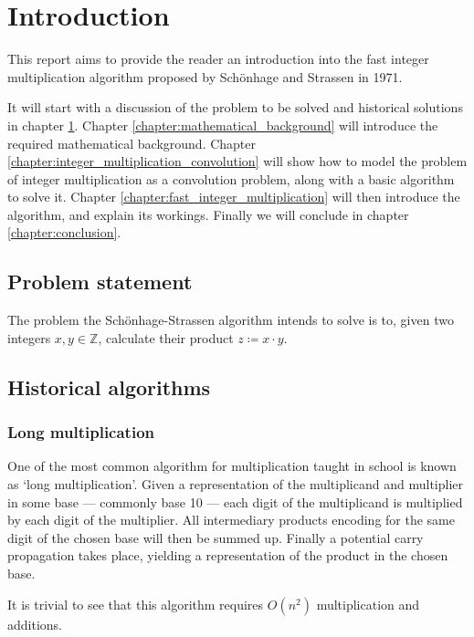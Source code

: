 \chapter{Introduction}
\label{chapter:introduction}

This report aims to provide the reader an introduction into the fast integer
multiplication algorithm proposed by Schönhage and Strassen in 1971.
\autocite{schonhageSchnelleMultiplikationGrosser1971}

It will start with a discussion of the problem to be solved and historical
solutions in chapter \ref{chapter:introduction}. Chapter
\ref{chapter:mathematical_background} will introduce the required mathematical
background. Chapter \ref{chapter:integer_multiplication_convolution} will show
how to model the problem of integer multiplication as a convolution problem,
along with a basic algorithm to solve it. Chapter
\ref{chapter:fast_integer_multiplication} will then introduce the algorithm,
and explain its workings. Finally we will conclude in chapter
\ref{chapter:conclusion}.

\section{Problem statement}

The problem the Schönhage-Strassen algorithm intends to solve is to, given two
integers $x, y \in \mathbb{Z}$, calculate their product $z \coloneqq x \cdot
y$.

\section{Historical algorithms}

\subsection{Long multiplication}

One of the most common algorithm for multiplication taught in school is known
as `long multiplication'. Given a representation of the multiplicand and
multiplier in some base --- commonly base 10 --- each digit of the multiplicand
is multiplied by each digit of the multiplier. All intermediary products
encoding for the same digit of the chosen base will then be summed up. Finally
a potential carry propagation takes place, yielding a representation of the
product in the chosen base.

It is trivial to see that this algorithm requires $O(n^2)$ multiplication and additions.

